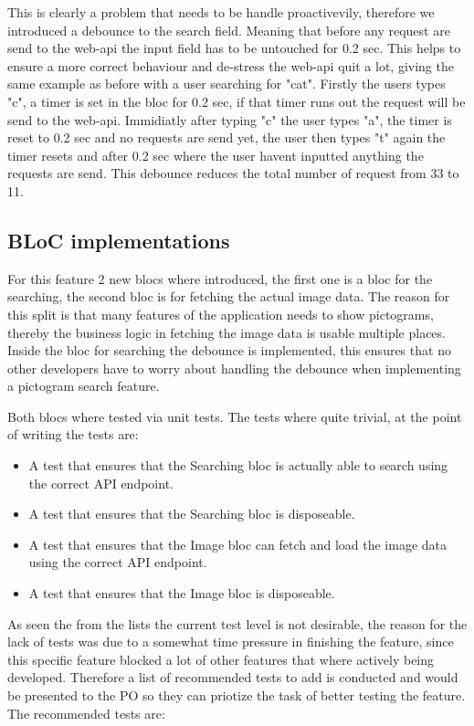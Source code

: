 This is clearly a problem that needs to be handle proactivevily, therefore we introduced a debounce to the search field. Meaning that before any request are send to the web-api the input field has to be untouched for 0.2 sec. This helps to ensure a more correct behaviour and de-stress the web-api quit a lot, giving the same example as before with a user searching for "cat". Firstly the users types "c", a timer is set in the \gls{bloc} for 0.2 sec, if that timer runs out the request will be send to the web-api. Immidiatly after typing "c" the user types "a", the timer is reset to 0.2 sec and no requests are send yet, the user then types "t" again the timer resets and after 0.2 sec where the user havent inputted anything the requests are send. This debounce reduces the total number of request from 33 to 11.

\subsection{BLoC implementations}
For this feature 2 new \glspl{bloc} where introduced, the first one is a \gls{bloc} for the searching, the second \gls{bloc} is for fetching the actual image data. The reason for this split is that many features of the application needs to show pictograms, thereby the business logic in fetching the image data is usable multiple places. Inside the \gls{bloc} for searching the debounce is implemented, this ensures that no other developers have to worry about handling the debounce when implementing a pictogram search feature.

Both \glspl{bloc} where tested via unit tests. The tests where quite trivial, at the point of writing the tests are:

\begin{itemize}
  \item A test that ensures that the Searching \gls{bloc} is actually able to search using the correct API endpoint.
  \item A test that ensures that the Searching \gls{bloc} is disposeable.
  \item A test that ensures that the Image \gls{bloc} can fetch and load the image data using the correct API endpoint.
  \item A test that ensures that the Image \gls{bloc} is disposeable.
\end{itemize}

As seen the from the lists the current test level is not desirable, the reason for the lack of tests was due to a somewhat time pressure in finishing the feature, since this specific feature blocked a lot of other features that where actively being developed. Therefore a list of recommended tests to add is conducted and would be presented to the \gls{PO} so they can priotize the task of better testing the feature. The recommended tests are:

